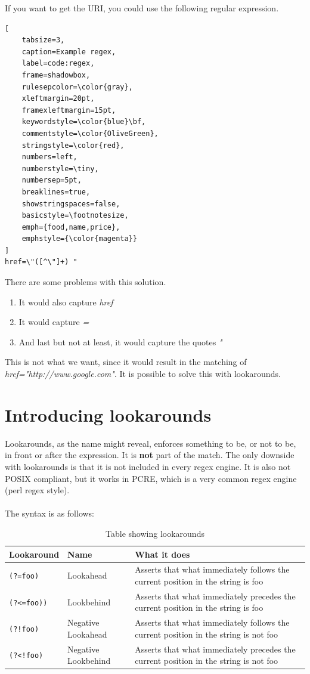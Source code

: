 If you want to get the URI, you could use the following regular expression.
\begin{lstlisting}[
	tabsize=3,
	caption=Example regex,
	label=code:regex,
	frame=shadowbox,
	rulesepcolor=\color{gray},
	xleftmargin=20pt,
	framexleftmargin=15pt,
	keywordstyle=\color{blue}\bf,
	commentstyle=\color{OliveGreen},
	stringstyle=\color{red},
	numbers=left,
	numberstyle=\tiny,
	numbersep=5pt,
	breaklines=true,
	showstringspaces=false,
	basicstyle=\footnotesize,
	emph={food,name,price},
	emphstyle={\color{magenta}}
]
href=\"([^\"]+) "
\end{lstlisting}
There are some problems with this solution.
\begin{enumerate}
\item It would also capture \textit{href}
\item It would capture \textit{=}
\item And last but not at least, it would capture the quotes \textit{"}
\end{enumerate}
This is not what we want, since it would result in the matching of \textit{href="http://www.google.com"}. It is possible to solve this with lookarounds.

\section{Introducing lookarounds}
\label{sec:introducing-lookarounds}
Lookarounds, as the name might reveal, enforces something to be, or not to be, in front or after the expression. It is \textbf{not} part of the match. The only downside with lookarounds is that it is not included in every regex engine. It is also not POSIX compliant, but it works in PCRE, which is a very common regex engine (perl regex style).
\\
\\
The syntax is as follows:\\
\begin{table}
\begin{tabular}{l | l || p{5cm}}
Lookaround & Name & What it does \\ \hline
\texttt{(?=foo)} & Lookahead & Asserts that what immediately follows the current position in the string is foo \\ \hline
\texttt{(?<=foo))} & Lookbehind & Asserts that what immediately precedes the current position in the string is foo \\ \hline
\texttt{(?!foo)} & Negative Lookahead & Asserts that what immediately follows the current position in the string is not foo \\ \hline
\texttt{(?<!foo)} & Negative Lookbehind & Asserts that what immediately precedes the current position in the string is not foo \\ \hline
\end{tabular}
\caption{Table showing lookarounds \cite{regex-lookaround}}
\end{table}

